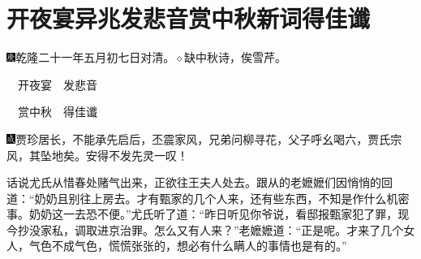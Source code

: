 
\chapter{开夜宴异兆发悲音\hspace{.5em}赏中秋新词得佳谶}
{\includegraphics[width=3mm]{../Images/00004}\kaishu 乾隆二十一年五月初七日对清。{$\diamond$}缺中秋诗，俟雪芹。}

{\kaishu {$\Box\Box\Box$}　开夜宴　发悲音}

{\kaishu {$\Box\Box\Box$}　赏中秋　得佳谶}

{\includegraphics[width=3mm]{../Images/00005}\kaishu 贾珍居长，不能承先启后，丕震家风，兄弟问柳寻花，父子呼幺喝六，贾氏宗风，其坠地矣。安得不发先灵一叹！}

话说尤氏从惜春处赌气出来，正欲往王夫人处去。跟从的老嬷嬷们因悄悄的回道：“奶奶且别往上房去。才有甄家的几个人来，还有些东西，不知是作什么机密事。奶奶这一去恐不便。”尤氏听了道：“昨日听见你爷说，看邸报甄家犯了罪，现今抄没家私，调取进京治罪。怎么又有人来？”老嬷嬷道：“正是呢。才来了几个女人，气色不成气色，慌慌张张的，想必有什么瞒人的事情也是有的。”

